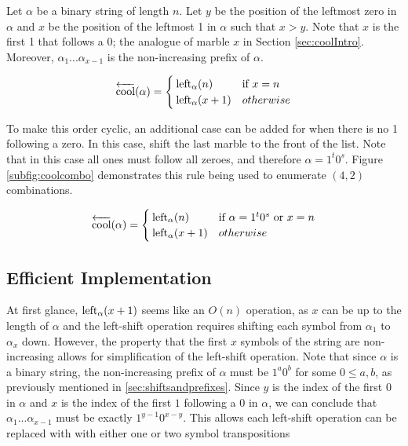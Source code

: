  Let $\alpha$ be a binary string of length $n$.
 Let $y$ be the position of the leftmost zero in $\alpha$ and $x$ be the position of the leftmost 1 in $\alpha$ such that $x > y$. Note that $x$ is the first 1 that follows a 0; the analogue of marble $x$ in Section \ref{sec:coolIntro}.  Moreover, $\alpha_1...\alpha_{x-1}$ is the non-increasing prefix of $\alpha$.



\begin{equation}\label{eq:coolComboCyclic}
    \overleftarrow{\text{cool}}(\alpha) = \begin{cases}
        \leftshift[\alpha]{n} & \text{if } x=n \\
	\leftshift[\alpha]{x+1} & otherwise
\end{cases}
\end{equation}

 To make this order cyclic, an additional case can be added for when there is no 1 following a zero. In this case, shift the last marble to the front of the list. Note that in this case all ones must follow all zeroes, and therefore $\alpha=1^t0^s$.  Figure \ref{subfig:coolcombo} demonstrates this rule being used to enumerate $(4,2)$ combinations.

\begin{equation}\label{eq:coolComboCyclic}
    \overleftarrow{\text{cool}}(\alpha) = \begin{cases}
        \leftshift[\alpha]{n} & \text{if } \alpha=1^t0^s \text{ or } x=n\\
	\leftshift[\alpha]{x+1} & otherwise
\end{cases}
\end{equation}




\subsection{Efficient Implementation}

At first glance, $\leftshift[\alpha]{x+1}$ seems like an $O(n)$ operation, as $x$ can be up to the length of $\alpha$ and the left-shift operation requires shifting each symbol from $\alpha_1$ to $\alpha_{x}$ down.  However, 
the property that the first $x$ symbols of the string are non-increasing allows for simplification of the left-shift operation. Note that since $\alpha$ is a binary string, the non-increasing prefix of $\alpha$ must be $1^a0^b$ for some $0 \le a,b$, as previously mentioned in \ref{sec:shiftsandprefixes}. Since $y$ is the index of the first $0$ in $\alpha$ and $x$ is the index of the first $1$ following a $0$ in $\alpha$, we can conclude that $\alpha_1...\alpha_{x-1}$ must be exactly $1^{y-1}0^{x-y}$. This allows each left-shift operation can be replaced with with either one or two symbol transpositions 

